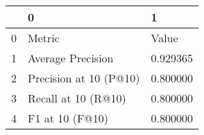 \begin{tabular}{lll}
\toprule
 & 0 & 1 \\
\midrule
0 & Metric & Value \\
1 & Average Precision & 0.929365 \\
2 & Precision at 10 (P@10) & 0.800000 \\
3 & Recall at 10 (R@10) & 0.800000 \\
4 & F1 at 10 (F@10) & 0.800000 \\
\bottomrule
\end{tabular}
